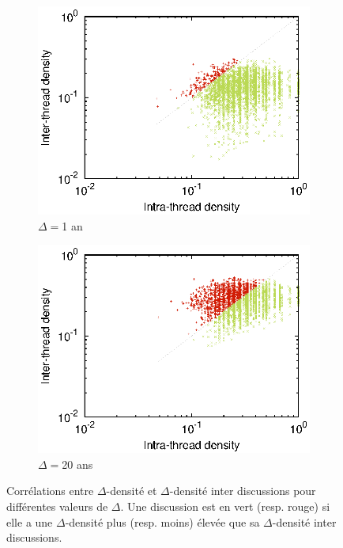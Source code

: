 \begin{figure}
	\begin{subfigure}{0.48\textwidth}
		\includegraphics[width=\linewidth]{img/mailing/DensityCurve/63072000/mean.eps}
		\caption{$\Delta= $1 an}		
	\end{subfigure}
	\begin{subfigure}{0.48\textwidth}
		\includegraphics[width=\linewidth]{img/mailing/DensityCurve/1261440000/mean.eps}
		\caption{$\Delta= $20 ans}	
		\label{fig:corel_inter_discussion_20}	
	\end{subfigure}

\caption{Corrélations entre $\Delta$-densité et $\Delta$-densité inter discussions pour différentes valeurs de $\Delta$. Une discussion est en vert (resp. rouge) si elle a une $\Delta$-densité plus (resp. moins) élevée que sa $\Delta$-densité inter discussions.}
\label{fig:corel_inter_discussion}
\end{figure}



